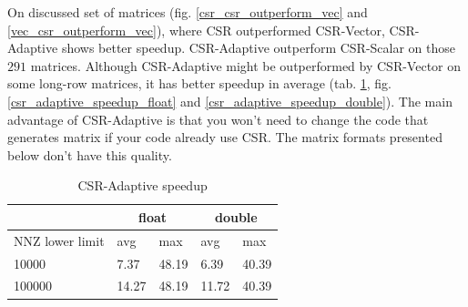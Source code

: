 \documentclass{article}
\begin{document}
On discussed set of matrices (fig. \ref{csr_csr_outperform_vec} and \ref{vec_csr_outperform_vec}), where CSR outperformed CSR-Vector, CSR-Adaptive
shows better speedup. CSR-Adaptive outperform CSR-Scalar on those $291$ matrices.
Although CSR-Adaptive might be outperformed by CSR-Vector on some long-row matrices, it has better speedup in average (tab. \ref{csr_vector_speedup_table}, 
fig. \ref{csr_adaptive_speedup_float} and \ref{csr_adaptive_speedup_double}). The main advantage of CSR-Adaptive is that you won't need to change
the code that generates matrix if your code already use CSR. The matrix formats presented below don't have this quality.

\begin{table}[H]
	\centering
	\begin{tabular}{ |p{2.6cm}||p{1cm}|p{1cm}|p{1cm}|p{1cm}|  }
	 \hline
		& \multicolumn{2}{|c|}{float} & \multicolumn{2}{|c|}{double}\\
	 \hline
	 NNZ lower limit & avg & max & avg & max  \\
	 \hline
	 10000  & 7.37  & 48.19 & 6.39 & 40.39 \\
	 100000 & 14.27 & 48.19 & 11.72 & 40.39 \\
	 \hline
	\end{tabular}
	\caption{CSR-Adaptive speedup}
  \label{csr_vector_speedup_table}
\end{table}

\begin{figure}[H]
\centering
{}
\qquad %
\end{figure}
\end{document}
